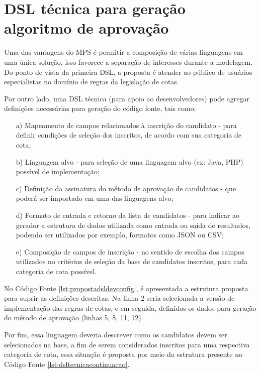 \section{DSL técnica para geração algoritmo de aprovação}
\label{sec:dslproposta:dev}

 Uma das vantagens do \gls{MPS} é permitir a composição de várias linguagens em uma única solução, isso favorece a separação de interesses durante a modelagem. Do ponto de vista da primeira \gls{DSL}, a proposta é atender ao público de usuários especialistas no domínio de regras da legislação de cotas. 
 
 Por outro lado, uma \gls{DSL} técnica (para apoio ao desenvolvedores) pode agregar definições necessárias para geração do código fonte, tais como:
 
 \begin{enumerate}
     \item[a)] Mapeamento de campos relacionados à inscrição do candidato - para definir condições de seleção dos inscritos, de acordo com sua categoria de cota;
     \item[b)] Linguagem alvo - para seleção de uma linguagem alvo (ex: Java, PHP) possível de implementação;
     \item[c)] Definição da assinatura do método de aprovação de candidatos - que poderá ser importado em uma das linguagens alvo;
     \item[d)] Formato de entrada e retorno da lista de candidatos - para indicar ao gerador a estrutura de dados utilizada como entrada ou saída de resultados, podendo ser utilizados por exemplo, formatos como JSON ou CSV;
     \item[e)] Composição de campos de inscrição - no sentido de escolha dos campos utilizados no critérios de seleção da base de candidatos inscritos, para cada categoria de cota possível.
 \end{enumerate}
 
    No Código Fonte \ref{lst:propostadsldevconfig}, é apresentada a estrutura proposta para suprir as definições descritas. Na linha 2 seria selecionada a versão de implementação das regras de cotas, e em seguida, definidos os dados para geração do método de aprovação (linhas 5, 8, 11, 12). 
    
    
 
 Por fim, essa linguagem deveria descrever como os candidatos devem ser selecionados na base, a fim de serem considerados inscritos para uma respectiva categoria de cota, essa situação é proposta por meio da estrutura presente no Código Fonte \ref{lst:dsltecnicacontinuacao}.
 
